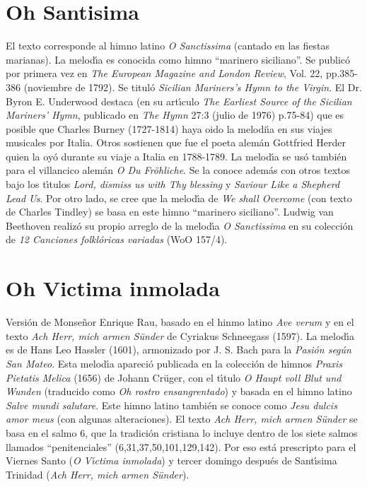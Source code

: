 \documentclass[landscape,12pt]{report}
\begin{document}
\section*{\small Oh Santisima} \noindent\footnotesize El texto corresponde al himno latino \textit{O Sanctissima} (cantado en las fiestas marianas).  La melod\'\i a es conocida como himno ``marinero siciliano''. Se public\'o por primera vez en \emph{The European Magazine and London Review}, Vol. 22, pp.385-386 (noviembre de 1792). Se titul\'o \emph{Sicilian Mariners's Hymn to the Virgin}. El Dr. Byron E. Underwood destaca (en su art\'\i culo \emph{The Earliest Source of the Sicilian Mariners' Hymn}, publicado en \emph{The Hymn} 27:3 (julio de 1976) p.75-84) que es posible que Charles Burney (1727-1814) haya oido la melodi\'\i a en sus viajes musicales por Italia. Otros sostienen que fue el poeta alem\'an Gottfried Herder quien la oy\'o durante su viaje a Italia en 1788-1789.  La melod\'\i a se us\'o tambi\'en para el villancico alem\'an \emph{O Du Fr\"ohliche}. Se la conoce adem\'as con otros textos bajo los t\'\i tulos \emph{Lord, dismiss us with Thy blessing} y \emph{Saviour Like a Shepherd Lead Us}. Por 
otro lado, se cree que la melod\'\i a de \emph{We shall Overcome} (con texto de Charles Tindley) se basa en este himno ``marinero siciliano''. Ludwig van Beethoven realiz\'o su propio arreglo de la melod\'\i a \textit{O Sanctissima} en su colecci\'on de \emph{12 Canciones folkl\'oricas variadas} (WoO 157/4). 
\section*{\small Oh Victima inmolada} \noindent\footnotesize Versi\'on de Monse\~nor Enrique Rau, basado en el hinmo latino \textit{Ave verum} y en el texto \textit{Ach Herr, mich armen S\"under} de Cyriakus Schneegass (1597). La melod\'\i a es de Hans Leo Hassler (1601), armonizado por J. S. Bach para la \textit{Pasi\'on seg\'un San Mateo}. Esta melod\'\i a apareci\'o publicada en la colecci\'on de himnos \textit{Praxis Pietatis Melica} (1656) de Johann Cr\"uger, con el t\'\i tulo \textit{O Haupt voll Blut und Wunden} (traducido como \textit{Oh rostro ensangrentado}) y basada en el himno latino \textit{Salve mundi salutare}. Este himno latino tambi\'en se conoce como \textit{Jesu dulcis amor meus} (con algunas alteraciones). El texto \textit{Ach Herr, mich armen S\"under} se basa en el salmo 6, que la tradici\'on cristiana lo incluye dentro de los siete salmos llamados ``penitenciales'' (6,31,37,50,101,129,142). Por eso est\'a prescripto para el Viernes Santo (\textit{O V\'\i ctima inmolada}) y tercer 
domingo despu\'es de Sant\'\i sima Trinidad (\textit{Ach Herr, mich armen S\"under}).
\end{document}
